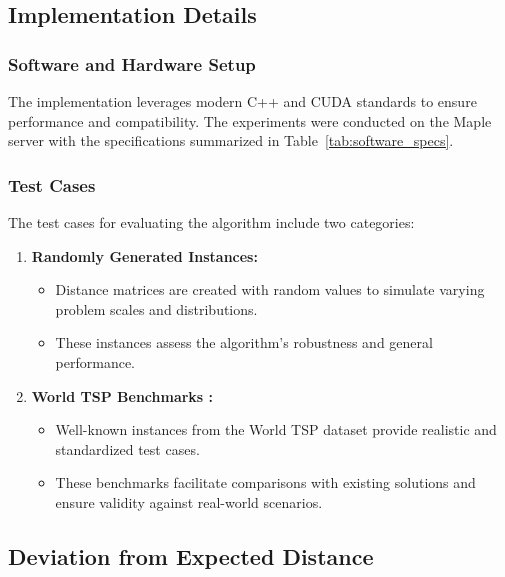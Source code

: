 \documentclass[conference]{IEEEtran}
\begin{document}
\subsection{Implementation Details}

\subsubsection{Software and Hardware Setup}

The implementation leverages modern C++ and CUDA standards to ensure performance and compatibility. The experiments were conducted on the Maple server with the specifications summarized in Table~\ref{tab:software_specs}.




\subsubsection{Test Cases}

The test cases for evaluating the algorithm include two categories:
\begin{enumerate}
    \item \textbf{Randomly Generated Instances:}
          \begin{itemize}
              \item Distance matrices are created with random values to simulate varying problem scales and distributions.
              \item These instances assess the algorithm’s robustness and general performance.
          \end{itemize}
    \item \textbf{World TSP Benchmarks \cite{worldtsp}:}
          \begin{itemize}
              \item Well-known instances from the World TSP dataset provide realistic and standardized test cases.
              \item These benchmarks facilitate comparisons with existing solutions and ensure validity against real-world scenarios.
          \end{itemize}
\end{enumerate}

\renewcommand{\arraystretch}{1.5}


\subsection{Deviation from Expected Distance}
\end{document}
